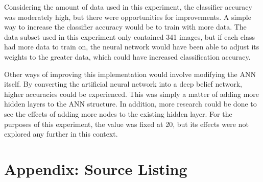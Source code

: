 \documentclass{article}
\begin{document}
Considering the amount of data used in this experiment, the classifier accuracy was moderately high, but there were opportunities for improvements. A simple way to increase the classifier accuracy would be to train with more data. The data subset used in this experiment only contained 341 images, but if each class had more data to train on, the neural network would have been able to adjust its weights to the greater data, which could have increased classification accuracy.

Other ways of improving this implementation would involve modifying the ANN itself. By converting the artificial neural network into a deep belief network, higher accuracies could be experienced. This was simply a matter of adding more hidden layers to the ANN structure. In addition, more research could be done to see the effects of adding more nodes to the existing hidden layer. For the purposes of this experiment, the value was fixed at 20, but its effects were not explored any further in this context.

\newpage



\newpage
\onecolumn
\appendix
\section{Appendix: Source Listing}
\label{sec:source}







\end{document}
